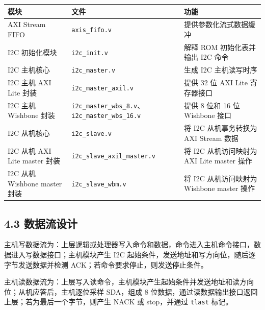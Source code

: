 {\def\LTcaptype{none} %
\begin{longtable}[]{@{}
  >{\raggedright\arraybackslash}p{}
  >{\raggedright\arraybackslash}p{}
  >{\raggedright\arraybackslash}p{}@{}}
\toprule\noalign{}
\begin{minipage}[b]{\linewidth}\raggedright
模块
\end{minipage} & \begin{minipage}[b]{\linewidth}\raggedright
文件
\end{minipage} & \begin{minipage}[b]{\linewidth}\raggedright
功能
\end{minipage} \\
\midrule\noalign{}
\endhead
\bottomrule\noalign{}
\endlastfoot
AXI Stream FIFO & \texttt{axis\_fifo.v} & 提供参数化流式数据缓冲 \\
I2C 初始化模块 & \texttt{i2c\_init.v} & 解释 ROM 初始化表并输出 I2C
命令 \\
I2C 主机核心 & \texttt{i2c\_master.v} & 生成 I2C 主机读写时序 \\
I2C 主机 AXI Lite 封装 & \texttt{i2c\_master\_axil.v} & 提供 32 位 AXI
Lite 寄存器接口 \\
I2C 主机 Wishbone 封装 &
\texttt{i2c\_master\_wbs\_8.v}、\texttt{i2c\_master\_wbs\_16.v} & 提供 8
位和 16 位 Wishbone 接口 \\
I2C 从机核心 & \texttt{i2c\_slave.v} & 将 I2C 从机事务转换为 AXI Stream
数据 \\
I2C 从机 AXI Lite master 封装 & \texttt{i2c\_slave\_axil\_master.v} & 将
I2C 从机访问映射为 AXI Lite master 操作 \\
I2C 从机 Wishbone master 封装 & \texttt{i2c\_slave\_wbm.v} & 将 I2C
从机访问映射为 Wishbone master 操作 \\
\end{longtable}
}

\subsection{4.3 数据流设计}\label{ux6570ux636eux6d41ux8bbeux8ba1}

主机写数据流为：上层逻辑或处理器写入命令和数据，命令进入主机命令接口，数据进入写数据接口；主机模块产生
I2C 起始条件，发送地址和写方向位，随后逐字节发送数据并检测
ACK；若命令要求停止，则发送停止条件。

主机读数据流为：上层写入读命令，主机模块产生起始条件并发送地址和读方向位；从机应答后，主机逐位采样
SDA，组成 8 位数据，通过读数据输出接口返回上层；若为最后一个字节，则产生
NACK 或 stop，并通过 \texttt{tlast} 标记。

